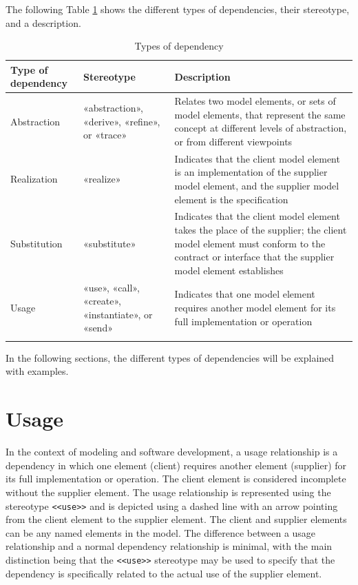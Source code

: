 \documentclass[
	12pt,
    a4paper,
    egregdoesnotlikesansseriftitles, %
    toc=chapterentrywithdots,
    oneside, openany,
    titlepage,
    parskip=half,
    headings=normal,  %
    listof=totoc,
    bibliography=totocnumbered,
    index=totoc,
    captions=tableheading,  %
    listof=flat,
    numbers=noenddot, %
    final]
    {scrbook}
\begin{document}
The following Table \ref{tab:dependencies} shows the different types of dependencies, their stereotype, and a description.

\vspace{1em}
{\RaggedRight
\begin{longtable} {|p{3.5cm}|p{3.25cm}|p{6.5cm}|}
		\hline
		\textbf{Type of dependency} & \textbf{Stereotype} & \textbf{Description} \\
		\hline
		Abstraction & «abstraction», «derive», «refine», or «trace» & Relates two model elements, or sets of model elements, that represent the same concept at different levels of abstraction, or from different viewpoints  \\ 
		\hline
		Realization & «realize» & 	Indicates that the client model element is an implementation of the supplier model element, and the supplier model element is the specification \\ 
		\hline
		Substitution & «substitute» & Indicates that the client model element takes the place of the supplier; the client model element must conform to the contract or interface that the supplier model element establishes  \\ 
		\hline
		Usage & «use», «call», «create», «instantiate», or «send» & Indicates that one model element requires another model element for its full implementation or operation  \\ 
		\hline
	\caption[Types of dependencies]{Types of dependency \cite{ibm_dependencies} \cite{uml}}
	\label{tab:dependencies}
\end{longtable}
}

In the following sections, the different types of dependencies will be explained with examples.

\section{Usage}
In the context of modeling and software development, a usage relationship is a dependency in which one element (client) requires another element (supplier) for its full implementation or operation. 
The client element is considered incomplete without the supplier element. 
The usage relationship is represented using the stereotype \texttt{<<use>>} and is depicted using a dashed line with an arrow pointing from the client element to the supplier element. 
The client and supplier elements can be any named elements in the model. 
The difference between a usage relationship and a normal dependency relationship is minimal, with the main distinction being that the \texttt{<<use>>} stereotype may be used to specify that the dependency is specifically related to the actual use of the supplier element. \cite[p. 161]{uml}
\end{document}
